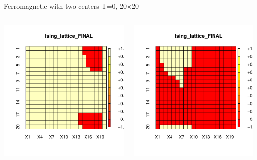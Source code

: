 \documentclass{beamer}
\begin{document}
\begin{frame}{Ferromagnetic with two centers T=0,  20$\times$20}
\begin{columns}
\begin{column}{0.5\textwidth}
    \begin{center}
     \includegraphics[width=\textwidth]{Pic/J+1_20_10000_T=0_FINAL.pdf}
     \end{center}
\end{column}
\begin{column}{0.5\textwidth}
    \begin{center}
     \includegraphics[width=\textwidth]{Pic/J+1_20_10000_T=0_FINAL_2.pdf}

\end{center}
\end{column}
\end{columns}
\end{frame}
\end{document}
